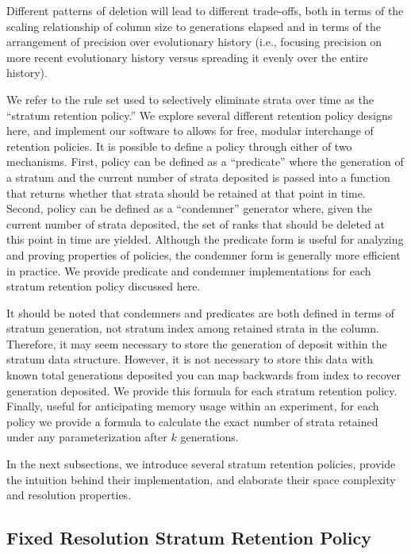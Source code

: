 Different patterns of deletion will lead to different trade-offs, both in terms of the scaling relationship of column size to generations elapsed and in terms of the arrangement of precision over evolutionary history (i.e., focusing precision on more recent evolutionary history versus spreading it evenly over the entire history).

We refer to the rule set used to selectively eliminate strata over time as the ``stratum retention policy.''
We explore several different retention policy designs here, and implement our software to allows for free, modular interchange of retention policies.
It is possible to define a policy through either of two mechanisms.
First, policy can be defined as a ``predicate'' where the generation of a stratum and the current number of strata deposited is passed into a function that returns whether that strata should be retained at that point in time.
Second, policy can be defined as a ``condemner'' generator where, given the current number of strata deposited, the set of ranks that should be deleted at this point in time are yielded.
Although the predicate form is useful for analyzing and proving properties of policies, the condemner form is generally more efficient in practice.
We provide predicate and condemner implementations for each stratum retention policy discussed here.

It should be noted that condemners and predicates are both defined in terms of stratum generation, not stratum index among retained strata in the column.
Therefore, it may seem necessary to store the generation of deposit within the stratum data structure.
However, it is not necessary to store this data with known total generations deposited you can map backwards from index to recover generation deposited.
We provide this formula for each stratum retention policy.
Finally, useful for anticipating memory usage within an experiment, for each policy we provide a formula to calculate the exact number of strata retained under any parameterization after $k$ generations.

In the next subsections, we introduce several stratum retention policies, provide the intuition behind their implementation, and elaborate their space complexity and resolution properties.

\subsection{Fixed Resolution Stratum Retention Policy}


